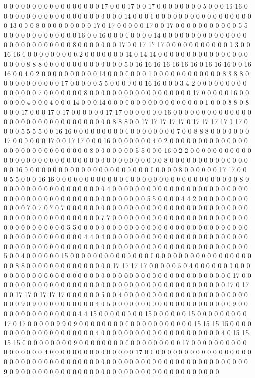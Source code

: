 0 0 0 0 0 0 0 0 0 0 0 0 0 0 0 0 0 17 0 0 0 17 0 0 17 0 0 0 0 0 0 0 0 5 0 0 0 16 16 0 0 0 0 0 0 0 0 0 0 0 0 0 0 0 0 0 0 0 0 0 0 14 0 0 0 0 0 0 0 0 0 0 0 0 0 0 0 0 0 0 0 0 0 0 13 0 0 0 8 0 0 0 0 0 0 0 0 0 17 0 17 0 0 0 0 0 17 0 0 17 0 0 0 0 0 0 0 0 0 0 0 5 5 0 0 0 0 0 0 0 0 0 0 0 0 0 16 0 0 16 0 0 0 0 0 0 0 0 14 0 0 0 0 0 0 0 0 0 0 0 0 0 0 0 0 0 0 0 0 0 0 0 0 0 0 0 8 0 0 0 0 0 0 0 17 0 0 17 17 17 0 0 0 0 0 0 0 0 0 0 0 0 3 0 0 16 16 0 0 0 0 0 0 0 0 0 0 2 0 0 0 0 0 0 0 14 0 14 14 0 0 0 0 0 0 0 0 0 0 0 0 0 0 0 0 0 0 0 0 8 8 8 0 0 0 0 0 0 0 0 0 0 0 0 0 0 5 0 16 16 16 16 16 16 16 0 16 16 16 0 0 16 16 0 0 4 0 2 0 0 0 0 0 0 0 0 0 0 14 0 0 0 0 0 0 0 1 0 0 0 0 0 0 0 0 0 0 0 0 8 8 8 8 0 0 0 0 0 0 0 0 0 0 0 17 0 0 0 0 0 5 5 0 0 0 0 0 0 16 16 0 0 0 3 4 2 0 0 0 0 0 0 0 0 0 0 0 0 0 0 0 7 0 0 0 0 0 0 0 8 0 0 0 0 0 0 0 0 0 0 0 0 0 0 0 0 0 0 17 0 0 0 0 0 16 0 0 0 0 0 0 4 0 0 0 4 0 0 0 14 0 0 0 14 0 0 0 0 0 0 0 0 0 0 0 0 0 0 0 0 0 1 0 0 0 8 8 0 8 0 0 0 17 0 0 0 17 0 17 0 0 0 0 0 0 17 17 0 0 0 0 0 0 0 16 0 0 0 0 0 0 0 0 0 0 0 0 0 0 0 0 0 0 0 0 0 0 0 0 0 0 0 0 0 0 0 0 0 8 8 8 0 0 17 17 17 17 17 0 17 17 17 17 0 17 0 0 0 0 5 5 5 5 0 0 16 16 0 0 0 0 0 0 0 0 0 0 0 0 0 0 0 0 0 0 7 0 0 8 8 8 0 0 0 0 0 0 0 17 0 0 0 0 0 0 17 0 0 17 17 0 0 0 16 0 0 0 0 0 0 0 4 0 2 0 0 0 0 0 0 0 0 0 0 0 0 0 0 0 0 0 0 0 0 0 0 0 0 0 0 0 0 0 8 0 0 0 0 0 0 0 5 5 0 0 0 16 0 2 2 0 0 0 0 0 0 0 0 0 0 0 0 0 0 0 0 0 0 0 0 0 0 0 0 0 0 0 0 0 0 0 0 0 0 0 0 0 0 0 8 0 0 0 0 0 0 0 0 0 0 0 0 0 0 0 0 16 0 0 0 0 0 0 0 0 0 0 0 0 0 0 0 0 0 0 0 0 0 0 0 0 0 0 0 8 0 0 0 0 0 0 17 17 0 0 0 5 5 0 0 0 16 16 0 0 0 0 0 0 0 0 0 0 0 0 0 0 0 0 0 0 0 0 0 0 0 0 0 0 0 0 0 0 0 0 8 0 0 0 0 0 0 0 0 0 0 0 0 0 0 0 0 0 0 0 4 0 0 0 0 0 0 0 0 0 0 0 0 0 0 0 0 0 0 0 0 0 0 0 0 0 0 0 0 0 0 0 0 0 0 0 0 0 0 0 0 0 0 0 0 0 0 0 0 0 5 5 0 0 0 0 4 4 2 0 0 0 0 0 0 0 0 0 0 0 0 0 7 0 7 0 7 0 7 0 0 0 0 0 0 0 0 0 0 0 0 0 0 0 0 0 0 0 0 0 0 0 0 0 0 0 0 0 0 0 0 0 0 0 0 0 0 0 0 0 0 0 0 0 0 0 0 0 7 7 0 0 0 0 0 0 0 0 0 0 0 0 0 0 0 0 0 0 0 0 0 0 0 0 0 0 0 0 0 0 0 0 0 0 0 5 5 0 0 0 0 0 0 0 0 0 0 0 0 0 0 0 0 0 0 0 0 0 0 0 0 0 0 0 0 0 0 0 0 0 0 0 0 0 0 0 0 0 0 0 0 4 4 0 4 0 0 0 0 0 0 0 0 0 0 0 0 0 0 0 0 0 0 0 0 0 0 0 0 0 0 0 0 0 0 0 0 0 0 0 0 0 0 0 0 0 0 0 0 0 0 0 0 0 0 0 0 0 0 0 0 0 0 0 0 0 0 0 0 0 0 0 0 5 0 0 4 0 0 0 0 0 0 15 0 0 0 0 0 0 0 0 0 0 0 0 0 0 0 0 0 0 0 0 0 0 0 0 0 0 0 0 0 0 0 0 0 0 8 8 0 0 0 0 0 0 0 0 0 0 0 0 0 0 0 17 17 17 17 0 0 0 0 0 5 0 4 0 0 0 0 0 0 0 0 0 0 0 0 0 0 0 0 0 0 0 0 0 0 0 0 0 0 0 0 0 0 0 0 0 0 0 0 0 0 0 0 0 0 0 0 0 0 0 0 0 0 17 0 0 0 0 0 0 0 0 0 0 0 0 0 0 0 0 0 0 0 0 0 0 0 0 0 0 0 0 0 0 0 0 0 0 0 0 0 0 0 0 0 17 0 17 0 0 17 17 0 17 17 17 0 0 0 0 0 0 5 0 0 4 0 0 0 0 0 0 0 0 0 0 0 0 0 0 0 0 0 0 0 0 0 0 0 0 0 9 0 9 0 0 0 0 0 0 0 0 0 0 4 0 5 0 0 0 0 0 0 0 0 0 0 0 0 0 0 0 0 0 0 0 0 0 9 0 0 0 0 0 0 0 0 0 0 0 0 0 0 0 4 4 15 0 0 0 0 0 0 0 0 15 0 0 0 0 0 0 15 0 0 0 0 0 0 0 0 0 17 0 17 0 0 0 0 0 9 9 0 9 0 0 0 0 0 0 0 0 0 0 0 0 0 0 0 0 0 0 0 0 15 15 15 15 0 0 0 0 0 0 0 0 0 0 0 0 0 0 0 0 0 0 0 0 4 0 0 0 0 0 0 0 0 0 0 0 0 0 0 0 0 0 0 0 0 0 4 0 15 15 15 15 0 0 0 0 0 0 0 0 0 9 0 0 0 0 0 0 0 0 0 0 0 0 0 0 0 0 0 0 17 0 0 0 0 0 0 0 0 0 0 0 0 0 0 0 0 0 4 0 0 0 0 0 0 0 0 0 0 0 0 0 0 0 17 0 0 0 0 0 0 0 0 0 0 0 0 0 0 0 0 0 0 0 0 0 0 0 0 0 0 0 0 0 0 0 0 0 0 0 0 0 0 0 0 0 0 0 0 0 0 0 0 0 0 0 0 0 0 0 0 0 0 0 0 0 0 9 0 9 0 0 0 0 0 0 0 0 0 0 0 0 0 0 0 0 0 0 0 0 0 0 0 0 0 0 0 0 0 0 0 0 0 0 0 